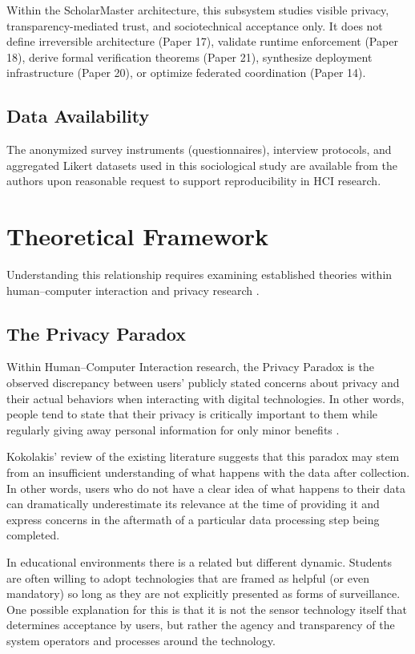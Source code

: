 \documentclass[conference]{IEEEtran}
\begin{document}
Within the ScholarMaster architecture, this subsystem studies visible privacy, transparency-mediated trust, and sociotechnical acceptance only. It does not define irreversible architecture (Paper 17), validate runtime enforcement (Paper 18), derive formal verification theorems (Paper 21), synthesize deployment infrastructure (Paper 20), or optimize federated coordination (Paper 14).

\subsection{Data Availability}
The anonymized survey instruments (questionnaires), interview protocols, and aggregated Likert datasets used in this sociological study are available from the authors upon reasonable request to support reproducibility in HCI research.

\section{Theoretical Framework}

Understanding this relationship requires examining established theories within human--computer interaction and privacy research \cite{b2}.

\subsection{The Privacy Paradox}
Within Human–Computer Interaction research, the Privacy Paradox is the observed discrepancy between users’ publicly stated concerns about privacy and their actual behaviors when interacting with digital technologies. In other words, people tend to state that their privacy is critically important to them while regularly giving away personal information for only minor benefits \cite{b3}.

Kokolakis’ review of the existing literature suggests that this paradox may stem from an insufficient understanding of what happens with the data after collection. In other words, users who do not have a clear idea of what happens to their data can dramatically underestimate its relevance at the time of providing it and express concerns in the aftermath of a particular data processing step being completed.

In educational environments there is a related but different dynamic. Students are often willing to adopt technologies that are framed as helpful (or even mandatory) so long as they are not explicitly presented as forms of surveillance. One possible explanation for this is that it is not the sensor technology itself that determines acceptance by users, but rather the agency and transparency of the system operators and processes around the technology.
\end{document}
